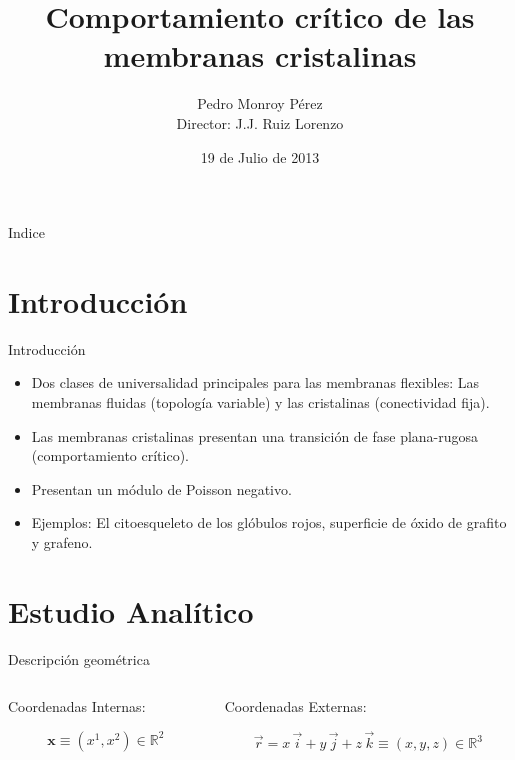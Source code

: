 \documentclass[xcolor=dvipsnames]{beamer}
\title[C. crítico de las membranas cristalinas]{Comportamiento crítico de las membranas cristalinas}
\author[P. Monroy Dir.: Juan J.Ruiz Lorenzo]{Pedro Monroy Pérez \\ Director:
  J.J. Ruiz Lorenzo}
\date{19 de Julio de 2013}
\institute[UEx]{Dep. de Física, Facultad de Ciencias, Universidad de Extremadura}
\begin{document}
\decimalpoint
\begin{frame}[plain]{}
\titlepage
\end{frame}


\begin{frame}{Indice}
  \tableofcontents[hideallsubsections]
\end{frame}
\section{Introducción}
\begin{frame}{Introducción}
\begin{itemize}
\item Dos clases de universalidad principales para las membranas flexibles:
  Las membranas fluidas (topología variable) y las cristalinas (conectividad fija). 
\item Las membranas cristalinas presentan una transición de fase plana-rugosa
  (comportamiento crítico).
\item Presentan un módulo de Poisson negativo.
\item Ejemplos: El citoesqueleto de los glóbulos rojos, superficie de óxido de grafito y grafeno. 
\end{itemize}
\end{frame}
\section{Estudio Analítico}

\begin{frame}{Descripción geométrica}
  \begin{columns}
    \begin{column}{5.8cm}
      \centering
      Coordenadas Internas:
      \begin{figure}[h]
        \resizebox{\columnwidth}{!}{}
      \end{figure}
      \begin{equation*}
        \mathbf{x}\equiv (x^1,x^2)\in \mathbb{R}^2
      \end{equation*}
    \end{column}
    \begin{column}{5.8cm}
      \centering
      Coordenadas Externas:
      \begin{figure}[h]
        \resizebox{\columnwidth}{!}{}
      \end{figure}
      \begin{equation*}
        \vec{r}=x\,\vec{i}+y\,\vec{j}+z\,\vec{k}\equiv (x,y,z)\in \mathbb{R}^3
      \end{equation*}
    \end{column}
  \end{columns}
\end{frame}
\end{document}
